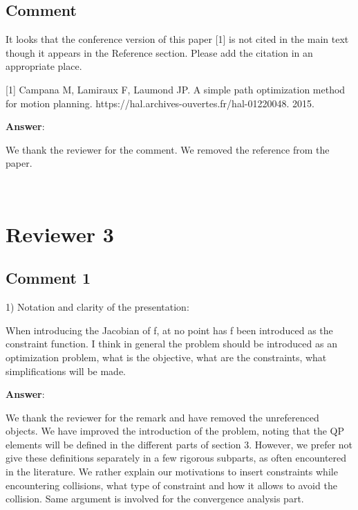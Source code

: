 \documentclass{scrartcl}
\begin{document}
\subsection{Comment}

It looks that the conference version of this paper [1] is not cited in the main text though it appears in the Reference section.  Please add the citation in an appropriate place.

[1] Campana M, Lamiraux F, Laumond JP. A simple path optimization method for 
motion planning. https://hal.archives-ouvertes.fr/hal-01220048. 2015.

\vspace{0.5cm}

\textbf{Answer}:

We thank the reviewer for the comment. We removed the reference from the paper.

\noindent
\hrulefill\\

\section{Reviewer 3}

\subsection{Comment 1}

1) Notation and clarity of the presentation:

When introducing the Jacobian of f, at no point has f been introduced as the constraint function. I think in general the problem should be introduced as an optimization problem, what is the objective, what are the constraints, what simplifications will be made.

\vspace{0.5cm}

\textbf{Answer}:

We thank the reviewer for the remark and have removed the unreferenced objects.
We have improved the introduction of the problem, noting that the QP elements will be defined in the different parts of section 3. However, we prefer not give these definitions separately in a few rigorous subparts, as often encountered in the literature. We rather explain our motivations to insert constraints while encountering collisions, what type of constraint and how it allows to avoid the collision. Same argument is involved for the convergence analysis part.
\end{document}
